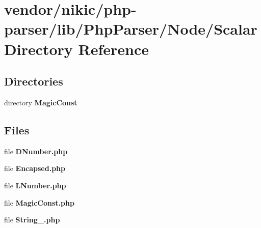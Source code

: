 \section{vendor/nikic/php-\/parser/lib/\+Php\+Parser/\+Node/\+Scalar Directory Reference}
\label{dir_8dc437002b98cbd39f5408fe76b8fcb6}
\subsection*{Directories}
\begin{DoxyCompactItemize}
\item 
directory {\bf Magic\+Const}
\end{DoxyCompactItemize}
\subsection*{Files}
\begin{DoxyCompactItemize}
\item 
file {\bf D\+Number.\+php}
\item 
file {\bf Encapsed.\+php}
\item 
file {\bf L\+Number.\+php}
\item 
file {\bf Magic\+Const.\+php}
\item 
file {\bf String\+\_\+.\+php}
\end{DoxyCompactItemize}
